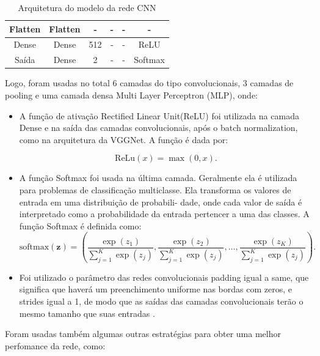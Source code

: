 \documentclass[]{abntex2}
\begin{document}
\begin{table}[H]
\begin{tabular}{|c|c|c|c|c|c|}
    \cellcolor[HTML]{C0C0C0}Flatten                          & Flatten       & -                    & -                 & -       & -           \\ \hline
    \cellcolor[HTML]{C0C0C0}Dense                            & Dense         & 512                  & -                 & -       & ReLU        \\ \hline
    \cellcolor[HTML]{C0C0C0}Saída                            & Dense         & 2                    & -                 & -       & Softmax     \\ \hline
    \end{tabular}
    \caption{Arquitetura do modelo da rede CNN}
    \label{tab:arquiCNN}

\end{table}

Logo, foram usadas no total 6 camadas do tipo convolucionais, 3 camadas de pooling e uma camada densa Multi Layer Perceptron (MLP), onde:

\begin{itemize}
    \item A função de ativação Rectified Linear Unit(ReLU) foi utilizada na camada Dense e na saída das camadas convolucionais, após o batch normalization, como na arquitetura da VGGNet. A função é dada por:
    
    \[
    \text{ReLu}(x) = \max(0, x).
    \]

    \item A função Softmax foi usada na última camada. Geralmente ela é utilizada para problemas de
    classificação multiclasse. Ela transforma os valores de entrada em uma distribuição de probabili-
    dade, onde cada valor de saída é interpretado como a probabilidade da entrada pertencer a uma
    das classes. A função Softmax é definida como:
    \[
        \text{softmax}(\mathbf{z}) = \left( \frac{\exp(z_1)}{\sum_{j=1}^{K} \exp(z_j)}, \frac{\exp(z_2)}{\sum_{j=1}^{K} \exp(z_j)}, \ldots, \frac{\exp(z_K)}{\sum_{j=1}^{K} \exp(z_j)} \right).
    \]
    
    \item Foi utilizado o parâmetro das redes convolucionais padding igual a same, que significa que haverá um preenchimento uniforme nas bordas com zeros, e strides igual a 1, de modo que as saídas das camadas convolucionais terão o mesmo tamanho que suas entradas \cite{keras}.
\end{itemize}

Foram usadas também algumas outras estratégias para obter uma melhor perfomance da rede, como:
\end{document}
